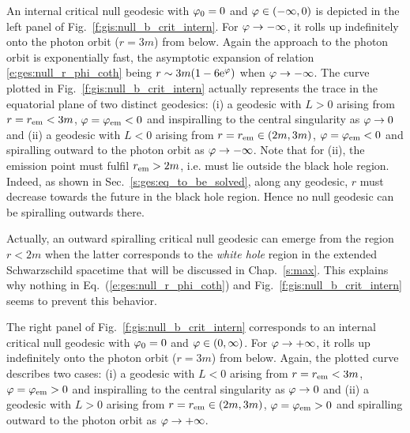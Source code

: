 An internal critical null geodesic with $\varphi_0=0$ and $\varphi\in(-\infty,0)$
is depicted in the left panel of Fig.~\ref{f:gis:null_b_crit_intern}.
For $\varphi\to -\infty$, it rolls up indefinitely onto the photon
orbit ($r=3m$) from below. Again the approach to the photon orbit is exponentially
fast, the asymptotic expansion of relation \eqref{e:ges:null_r_phi_coth} being
$r\sim 3m (1 - 6 \mathrm{e}^\varphi)$ when $\varphi\to -\infty$.
The curve plotted in Fig.~\ref{f:gis:null_b_crit_intern} actually represents the trace in the equatorial plane of two
distinct geodesics: (i) a geodesic with $L>0$ arising
from $r=r_{\rm em} < 3 m$, $\varphi=\varphi_{\rm em}<0$ and inspiralling to the
central singularity as $\varphi\to 0$ and (ii) a geodesic with $L<0$ arising from
$r = r_{\rm em} \in (2m,  3 m)$, $\varphi=\varphi_{\rm em}<0$ and spiralling outward
to the photon orbit as $\varphi\to -\infty$. Note that for (ii), the
emission point must fulfil $r_{\rm em} > 2m$, i.e. must lie outside the black
hole region. Indeed, as shown in Sec.~\ref{s:ges:eq_to_be_solved}, along
any geodesic, $r$ must decrease towards the future in the black hole region.
Hence no null geodesic can be spiralling outwards there.

\begin{remark}
Actually, an outward spiralling critical null geodesic can emerge from
the region $r<2m$ when the latter corresponds to the \emph{white hole} region
in the extended Schwarzschild spacetime that will be discussed in Chap.~\ref{s:max}.
This explains why nothing in Eq.~(\ref{e:ges:null_r_phi_coth}) and
Fig.~\ref{f:gis:null_b_crit_intern} seems to prevent
this behavior.
\end{remark}

The right panel of Fig.~\ref{f:gis:null_b_crit_intern} corresponds to an
internal critical null geodesic with $\varphi_0=0$ and $\varphi\in(0, \infty)$.
For $\varphi\to +\infty$, it rolls up indefinitely onto the photon
orbit ($r=3m$) from below. Again, the plotted curve describes two cases:
(i) a geodesic with $L<0$ arising
from $r=r_{\rm em} < 3 m$, $\varphi=\varphi_{\rm em}>0$ and inspiralling to the
central singularity as $\varphi\to 0$ and (ii) a geodesic with $L>0$ arising from
$r = r_{\rm em} \in (2m,  3 m)$, $\varphi=\varphi_{\rm em}>0$ and spiralling outward
to the photon orbit as $\varphi\to +\infty$.

